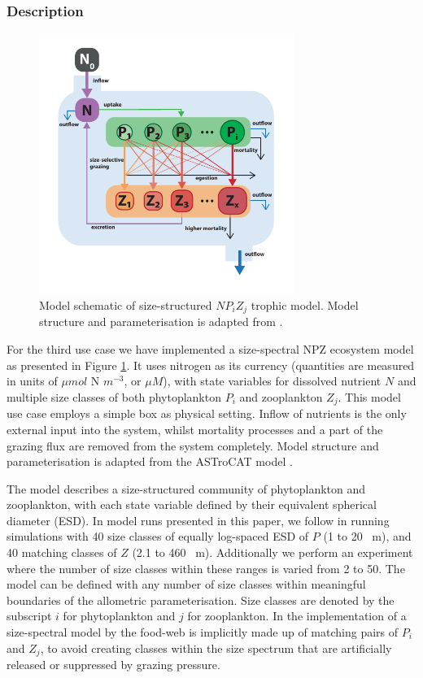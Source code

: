 \documentclass[journal abbreviation, manuscript]{copernicus}
\begin{document}
\subsubsection{Description}
\begin{figure}[t]
\includegraphics[width=8.3cm]{Figures/firstdraft_schematics/03_schematics_ASTroCAT.pdf}
\caption{Model schematic of size-structured $NP_{i}Z_{j}$ trophic model. Model structure and parameterisation is adapted from \citet{Banas2011b}.}
\label{Figure:ModelSchematics_3}
\end{figure}

For the third use case we have implemented a size-spectral NPZ ecosystem model as presented in Figure \ref{Figure:ModelSchematics_3}. It uses nitrogen as its currency (quantities are measured in units of $\mu mol$ N $m^{-3}$, or $\mu M$), with state variables for dissolved nutrient $N$ and multiple size classes of both phytoplankton $P_i$ and zooplankton $Z_j$. 
This model use case employs a simple box as physical setting. Inflow of nutrients is the only external input into the system, whilst mortality processes and a part of the grazing flux are removed from the system completely. Model structure and parameterisation is adapted from the ASTroCAT model \citep{Banas2011b}.

The model describes a size-structured community of phytoplankton and zooplankton, with each state variable defined by their equivalent spherical diameter (ESD). In model runs presented in this paper, we follow \citet{Banas2011b} in running simulations with 40 size classes of equally log-spaced ESD of $P$ (1 to 20 \unit{\mu m}), and 40 matching classes of $Z$ (2.1 to 460  \unit{\mu m}). Additionally we perform an experiment where the number of size classes within these ranges is varied from 2 to 50.
The model can be defined with any number of size classes within meaningful boundaries of the allometric parameterisation. Size classes are denoted by the subscript $i$ for phytoplankton and $j$ for zooplankton. In the implementation of a size-spectral model by \citeauthor{Banas2011b} the food-web is implicitly made up of matching pairs of $P_i$ and $Z_j$, to avoid creating classes within the size spectrum that are artificially released or suppressed by grazing pressure.
\end{document}
